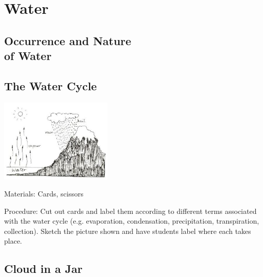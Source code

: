 \section{Water} 

\begin{multicols}{2}


\section*{Occurrence and Nature \hfill \\ of Water} 


\subsection{The Water Cycle} 

\begin{center}
\includegraphics[width=0.4\textwidth]{./img/source/water-cycle.jpg}
\end{center}

\begin{description*}
\item[Materials:]{Cards, scissors}
\item[Procedure:]{Cut out cards and label them according to different terms associated with the water cycle (e.g. evaporation, condensation, precipitation, transpiration, collection). Sketch the picture shown and have students label where each takes place.}
\end{description*}

\subsection{Cloud in a Jar} 


\end{multicols}
